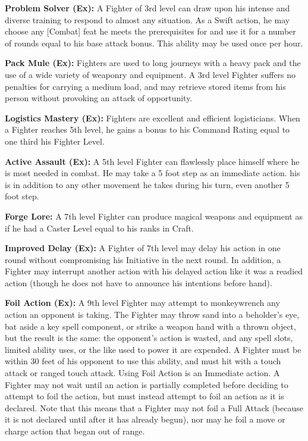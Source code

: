 \textbf{Problem Solver (Ex):} A Fighter of 3rd level can draw upon his intense and diverse training to respond to almost any situation. As a Swift action, he may choose any [Combat] feat he meets the prerequisites for and use it for a number of rounds equal to his base attack bonus. This ability may be used once per hour.

\textbf{Pack Mule (Ex):} Fighters are used to long journeys with a heavy pack and the use of a wide variety of weaponry and equipment. A 3rd level Fighter suffers no penalties for carrying a medium load, and may retrieve stored items from his person without provoking an attack of opportunity.

\textbf{Logistics Mastery (Ex):} Fighters are excellent and efficient logisticians. When a Fighter reaches 5th level, he gains a bonus to his Command Rating equal to one third his Fighter Level.

\textbf{Active Assault (Ex):} A 5th level Fighter can flawlessly place himself where he is most needed in combat. He may take a 5 foot step as an immediate action. his is in addition to any other movement he takes during his turn, even another 5 foot step.

\textbf{Forge Lore:} A 7th level Fighter can produce magical weapons and equipment as if he had a Caster Level equal to his ranks in Craft.

\textbf{Improved Delay (Ex):} A Fighter of 7th level may delay his action in one round without compromising his Initiative in the next round. In addition, a Fighter may interrupt another action with his delayed action like it was a readied action (though he does not have to announce his intentions before hand).

\textbf{Foil Action (Ex):} A 9th level Fighter may attempt to monkeywrench any action an opponent is taking. The Fighter may throw sand into a beholder's eye, bat aside a key spell component, or strike a weapon hand with a thrown object, but the result is the same: the opponent's action is wasted, and any spell slots, limited ability uses, or the like used to power it are expended. A Fighter must be within 30 feet of his opponent to use this ability, and must hit with a touch attack or ranged touch attack. Using Foil Action is an Immediate action. A Fighter may not wait until an action is partially completed before deciding to attempt to foil the action, but must instead attempt to foil an action as it is declared. Note that this means that a Fighter may not foil a Full Attack (because it is not declared until after it has already begun), nor may he foil a move or charge action that began out of range.

